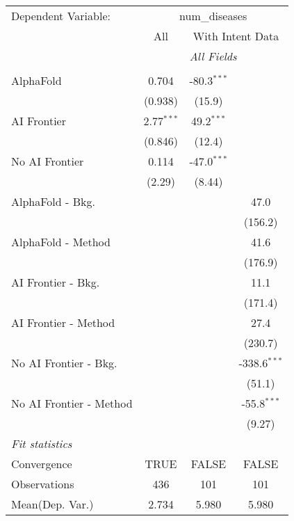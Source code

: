 \begingroup
\centering
\begin{tabular}{lccc}
   \tabularnewline \midrule \midrule
   Dependent Variable: & \multicolumn{3}{c}{num\_diseases}\\
 & \multicolumn{1}{c}{All} & \multicolumn{2}{c}{With Intent Data} \\
\cmidrule(lr){2-2} \cmidrule(lr){3-4}
 & \multicolumn{3}{c}{\textit{All Fields}} \\ \\
   AlphaFold               & 0.704        & -80.3$^{***}$ &   \\   
                           & (0.938)      & (15.9)        &   \\   
   AI Frontier             & 2.77$^{***}$ & 49.2$^{***}$  &   \\   
                           & (0.846)      & (12.4)        &   \\   
   No AI Frontier          & 0.114        & -47.0$^{***}$ &   \\   
                           & (2.29)       & (8.44)        &   \\   
   AlphaFold - Bkg.        &              &               & 47.0\\   
                           &              &               & (156.2)\\   
   AlphaFold - Method      &              &               & 41.6\\   
                           &              &               & (176.9)\\   
   AI Frontier - Bkg.      &              &               & 11.1\\   
                           &              &               & (171.4)\\   
   AI Frontier - Method    &              &               & 27.4\\   
                           &              &               & (230.7)\\   
   No AI Frontier - Bkg.   &              &               & -338.6$^{***}$\\   
                           &              &               & (51.1)\\   
   No AI Frontier - Method &              &               & -55.8$^{***}$\\   
                           &              &               & (9.27)\\   
   \midrule
   \emph{Fit statistics}\\
   Convergence             &TRUE          & FALSE         & FALSE\\  
   Observations            & 436          & 101           & 101\\  
Mean(Dep. Var.) & 2.734 & 5.980 & 5.980 \\
   

\end{tabular}
